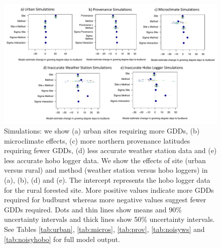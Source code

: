 \documentclass{article}\usepackage[]{graphicx}\usepackage[]{color}
\begin{document}
  
\begin{figure}[H]
      \centering
      \includegraphics[width=16cm]{..//analyses/figures/muplot_sims.pdf}
\caption{ Simulations: we show (a) urban sites requiring more GDDs, (b) microclimate effects, (c) more northern provenance latitudes requiring fewer GDDs, (d) less accurate weather station data and (e) less accurate hobo logger data. We show the effects of site (urban versus rural) and method (weather station versus hobo loggers) in (a), (b), (d) and (e). The intercept represents the hobo logger data for the rural forested site. More positive values indicate more GDDs required for budburst whereas more negative values suggest fewer GDDs required. Dots and thin lines show means and 90\% uncertainty intervals and thick lines show 50\% uncertainty intervals. See Tables \ref{tab:urban}, \ref{tab:micros}, \ref{tab:prov}, \ref{tab:noisyws} and \ref{tab:noisyhobo} for full model output. } 
\label{fig:musims}
\end{figure}
  
\end{document}
